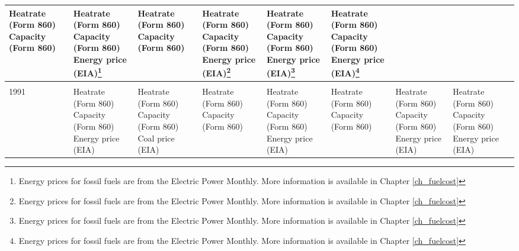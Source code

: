 \documentclass[10pt]{report}
\begin{document}
\begin{scriptsize}
\begin{landscape}
\begin{center}
\begin{longtable}{|lllllllll|}
\shortstack{Heatrate (Form 860) \\ Capacity (Form 860)} &
\shortstack{Heatrate (Form 860) \\ Capacity (Form 860) \\ Energy price (EIA)\footnote{Energy prices for fossil fuels are from the Electric Power Monthly. More information is available in Chapter \ref{ch_fuelcost}}} &
\shortstack{Heatrate (Form 860) \\ Capacity (Form 860)} &
\shortstack{Heatrate (Form 860) \\ Capacity (Form 860) \\ Energy price (EIA)\footnote{Energy prices for fossil fuels are from the Electric Power Monthly. More information is available in Chapter \ref{ch_fuelcost}}} &
\shortstack{Heatrate (Form 860) \\ Capacity (Form 860) \\ Energy price (EIA)\footnote{Energy prices for fossil fuels are from the Electric Power Monthly. More information is available in Chapter \ref{ch_fuelcost}}} &
\shortstack{Heatrate (Form 860) \\ Capacity (Form 860) \\ Energy price (EIA)\footnote{Energy prices for fossil fuels are from the Electric Power Monthly. More information is available in Chapter \ref{ch_fuelcost}}}\\
\hline \\
1991 & \shortstack{Heatrate (Form 860) \\ Capacity (Form 860) \\ Energy price (EIA)} &
\shortstack{Heatrate (Form 860) \\ Capacity (Form 860) \\ Coal price (EIA)} &
\shortstack{Heatrate (Form 860) \\ Capacity (Form 860)} &
\shortstack{Heatrate (Form 860) \\ Capacity (Form 860) \\ Energy price (EIA)} &
\shortstack{Heatrate (Form 860) \\ Capacity (Form 860)} &
\shortstack{Heatrate (Form 860) \\ Capacity (Form 860) \\ Energy price (EIA)} &
\shortstack{Heatrate (Form 860) \\ Capacity (Form 860) \\ Energy price (EIA)} &

\end{longtable}
\end{center}
\end{landscape}
\end{scriptsize}
\end{document}
